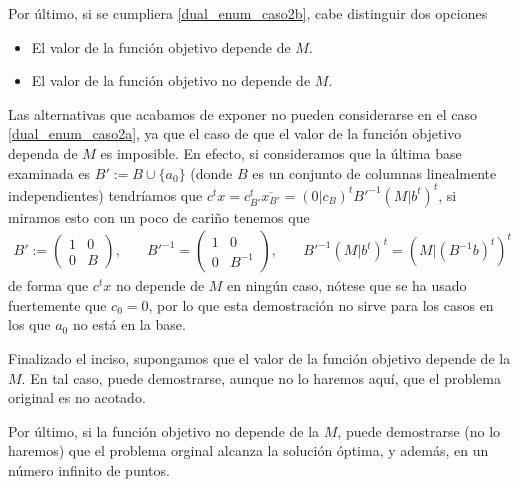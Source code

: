Por último, si se cumpliera \ref{dual_enum_caso2b}, cabe distinguir dos opciones
\begin{itemize}
	\item El valor de la función objetivo depende de $M$.
	\item El valor de la función objetivo no depende de $M$.
\end{itemize}
\begin{obs}[Dependencia de la $M$]
	\label{dual_obs_M}
	Las alternativas que acabamos de exponer no pueden considerarse en el caso \ref{dual_enum_caso2a}, ya que el caso de que el valor de la función objetivo dependa de $M$ es imposible. En efecto, si consideramos que la última base examinada es $B':=B\cup\{a_0\}$ (donde $B$ es un conjunto de columnas linealmente independientes) tendríamos que $c^tx=c_{B'}^t\overline{x_{B'}}=(0|c_{B})^tB'^{-1}(M|b^t)^t$, si miramos esto con un poco de cariño tenemos que
	\begin{equation*}
	\begin{array}{ccc}
	
	B':=\left(\begin{array}{c|c}
	1&0\\
	\hline
	0&B
	\end{array}\right),\quad
	&
	B'^{-1}=\left(\begin{array}{c|c}
	1&0\\
	\hline
	0&B^{-1}
	\end{array}\right),\quad
	&
	B'^{-1}(M|b^t)^t=(M|(B^{-1}b)^t)^t
	\end{array}
	\end{equation*}
	de forma que $c^tx$ no depende de $M$ en ningún caso, nótese que se ha usado fuertemente que $c_0=0$, por lo que esta demostración no sirve para los casos en los que $a_0$ no está en la base.
\end{obs}
Finalizado el inciso, supongamos que el valor de la función objetivo depende de la $M$. En tal caso, puede demostrarse, aunque no lo haremos aquí, que el problema original es no acotado.

Por último, si la función objetivo no depende de la $M$, puede demostrarse (no lo haremos) que el problema orginal alcanza la solución óptima, y además, en un número infinito de puntos.